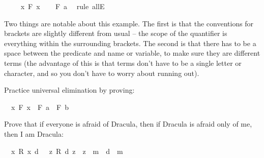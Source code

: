 \begin{isabellebody}
\isanewline
\ \ \isamarkupfalse%
\ {\isachardoublequoteopen}{\isasymforall}\ x{\isachardot}\ F\ x{\isachardoublequoteclose}\isanewline
\ \ \isamarkupfalse%
\ {\isachardoublequoteopen}F\ a{\isachardoublequoteclose}\ \isamarkupfalse%
\ {\isacharparenleft}rule\ allE{\isacharparenright}\isanewline
{}\isamarkupfalse%
%
\endisatagproof
{\isafoldproof}%
%
\isadelimproof
%
\endisadelimproof
%
\begin{isamarkuptext}%
Two things are notable about this example. The first is that the conventions for brackets are 
slightly different from usual -- the scope of the quantifier is everything within the surrounding 
brackets. The second is that there has to be a space between the predicate and name or variable,
to make sure they are different terms (the advantage of this is that terms don't have to be a single
letter or character, and so you don't have to worry about running out).%
\end{isamarkuptext}\isamarkuptrue%
%
\begin{isamarkuptext}%
\begin{Exercise} Practice universal elimination by proving: \end{Exercise}%
\end{isamarkuptext}\isamarkuptrue%
\isamarkupfalse%
\ {\isachardoublequoteopen}{\isacharparenleft}{\isasymforall}\ x{\isachardot}\ F\ x{\isacharparenright}\ {\isasymlongrightarrow}\ F\ a\ {\isasymand}\ F\ b{\isachardoublequoteclose}%
\isadelimproof
\ %
\endisadelimproof
%
\isatagproof
{}\isamarkupfalse%
%
\endisatagproof
{\isafoldproof}%
%
\isadelimproof
%
\endisadelimproof
%
\begin{isamarkuptext}%
\begin{Exercise}[title = The Riddle of Dracula]
Prove that if everyone is afraid of Dracula, then if Dracula is afraid only of me, then I am Dracula: \end{Exercise}%
\end{isamarkuptext}\isamarkuptrue%
\isamarkupfalse%
\ {\isachardoublequoteopen}{\isacharparenleft}{\isasymforall}\ x{\isachardot}\ R\ x\ d{\isacharparenright}\ {\isasymlongrightarrow}\ {\isacharparenleft}{\isasymforall}\ z{\isachardot}\ R\ d\ z\ {\isasymlongrightarrow}\ z\ {\isacharequal}\ m{\isacharparenright}\ {\isasymlongrightarrow}\ d\ {\isacharequal}\ m{\isachardoublequoteclose}%
\isadelimproof
\ %
\endisadelimproof
%
\isatagproof
{}\isamarkupfalse%
%
\endisatagproof
{\isafoldproof}%

\end{isabellebody}
